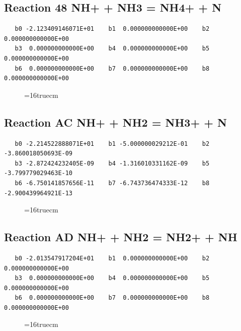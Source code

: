 \documentclass[12pt,dvipdfm]{article}
\begin{document}
\subsection{
Reaction 48 NH+ + NH3 = NH4+ + N}
\begin{small}\begin{verbatim}
   b0 -2.123409146071E+01    b1  0.000000000000E+00    b2  0.000000000000E+00
   b3  0.000000000000E+00    b4  0.000000000000E+00    b5  0.000000000000E+00
   b6  0.000000000000E+00    b7  0.000000000000E+00    b8  0.000000000000E+00
   \end{verbatim}\end{small}
\begin{figure}[h!]
\label{n2rates}
\epsfxsize=16truecm
\end{figure}
\newpage

\subsection{
Reaction AC NH+ + NH2 = NH3+ + N}
\begin{small}\begin{verbatim}
   b0 -2.214522888071E+01    b1 -5.000000029212E-01    b2 -3.860018050693E-09
   b3 -2.872424232405E-09    b4 -1.316010331162E-09    b5 -3.799779029463E-10
   b6 -6.750141857656E-11    b7 -6.743736474333E-12    b8 -2.900439964921E-13
   \end{verbatim}\end{small}
\begin{figure}[h!]
\label{n2rates}
\epsfxsize=16truecm
\end{figure}
\newpage

\subsection{
Reaction AD NH+ + NH2 = NH2+ + NH}
\begin{small}\begin{verbatim}
   b0 -2.013547917204E+01    b1  0.000000000000E+00    b2  0.000000000000E+00
   b3  0.000000000000E+00    b4  0.000000000000E+00    b5  0.000000000000E+00
   b6  0.000000000000E+00    b7  0.000000000000E+00    b8  0.000000000000E+00
   \end{verbatim}\end{small}
\begin{figure}[h!]
\label{n2rates}
\epsfxsize=16truecm
\end{figure}
\newpage
\end{document}
